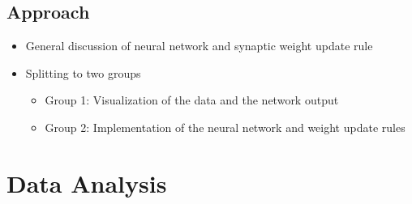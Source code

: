 \documentclass{beamer}
\begin{document}
\subsection{Approach}
\begin{frame}
 \begin{itemize}
  \item General discussion of neural network and synaptic weight update rule
  \item Splitting to two groups
  \begin{itemize}
    \item Group 1: Visualization of the data and the network output
    \item Group 2: Implementation of the neural network and weight update rules
  \end{itemize}
 \end{itemize}

\end{frame}

\section{Data Analysis}
\end{document}
